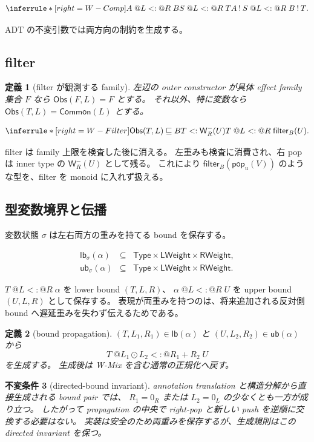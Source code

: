 \documentclass[uplatex,dvipdfmx,a4paper,10.5pt]{jsarticle}
\makeatletter
\theoremstyle{jpplain}
\newtheorem{definition}{定義}[section]
\newtheorem{invariant}[definition]{不変条件}
\newcommand{\lb}{\mathsf{lb}}
\newcommand{\ub}{\mathsf{ub}}
\newcommand{\Common}{\mathsf{Common}}
\newcommand{\Obs}{\mathsf{Obs}}
\newcommand{\Filter}[2]{\mathsf{filter}_{#1}(#2)}
\newcommand{\NWeight}[2]{\mathsf{W}^{-}_{#1}(#2)}
\newcommand{\popop}[1]{\mathsf{pop}_{#1}}
\newcommand{\comp}{\mathbin{!}}
\newcommand{\wsub}[4]{#1\;@#2\mathrel{<:}@#3\;#4}
\newcommand{\subty}[2]{#1\mathrel{<:}#2}
\newcommand{\fsub}[2]{#1\mathrel{\sqsubseteq}#2}
\makeatother
\begin{document}
\[
\inferrule*[right=W-Comp]
 {\wsub{A}{L}{R}{B}\\\wsub{S}{L}{R}{T}}
 {\wsub{A\comp S}{L}{R}{B\comp T}}.
\]

ADT の不変引数では両方向の制約を生成する。

\subsection{filter}

\begin{definition}[filter が観測する family]
左辺の outer constructor が具体 effect family 集合 $F$ なら
$\Obs(F,L)=F$ とする。
それ以外、特に変数なら
$\Obs(T,L)=\Common(L)$ とする。
\end{definition}

\[
\inferrule*[right=W-Filter]
 {\fsub{\Obs(T,L)}{B}\\
  \subty{T}{\NWeight{R}{U}}}
 {\wsub{T}{L}{R}{\Filter{B}{U}}}.
\]

filter は family 上限を検査した後に消える。
左重みも検査に消費され、右 pop は inner type の $\NWeight{R}{U}$ として残る。
これにより $\Filter{B}{\popop{u}(V)}$ のような型を、filter を monoid に入れず扱える。

\subsection{型変数境界と伝播}

変数状態 $\sigma$ は左右両方の重みを持てる bound を保存する。

\[
\begin{array}{rcl}
\lb_\sigma(\alpha)&\subseteq&\mathsf{Type}\times\mathsf{LWeight}\times\mathsf{RWeight},\\
\ub_\sigma(\alpha)&\subseteq&\mathsf{Type}\times\mathsf{LWeight}\times\mathsf{RWeight}.
\end{array}
\]

$\wsub{T}{L}{R}{\alpha}$ を lower bound $(T,L,R)$、
$\wsub{\alpha}{L}{R}{U}$ を upper bound $(U,L,R)$ として保存する。
表現が両重みを持つのは、将来追加される反対側 bound へ遅延重みを失わず伝えるためである。

\begin{definition}[bound propagation]
$(T,L_1,R_1)\in\lb(\alpha)$ と
$(U,L_2,R_2)\in\ub(\alpha)$ から
\[
  \wsub{T}{L_1\odot L_2}{R_1+R_2}{U}
\]
を生成する。
生成後は W-Mix を含む通常の正規化へ戻す。
\end{definition}

\begin{invariant}[directed-bound invariant]
annotation translation と構造分解から直接生成される bound pair では、
$R_1=0_R$ または $L_2=0_L$ の少なくとも一方が成り立つ。
したがって propagation の中央で right-pop と新しい push を逆順に交換する必要はない。
実装は安全のため両重みを保存するが、生成規則はこの directed invariant を保つ。
\end{invariant}
\end{document}
